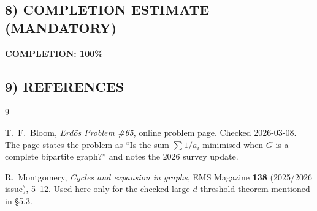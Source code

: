 \subsection*{8) COMPLETION ESTIMATE (MANDATORY)}

\textbf{COMPLETION: 100\%}

\subsection*{9) REFERENCES}

\begin{thebibliography}{9}

T.~F.~Bloom,
\emph{Erd\H{o}s Problem \#65}, online problem page.
Checked 2026-03-08.
The page states the problem as
``Is the sum $\sum 1/a_i$ minimised when $G$ is a complete bipartite graph?''
and notes the 2026 survey update.

R.~Montgomery,
\emph{Cycles and expansion in graphs},
EMS Magazine \textbf{138} (2025/2026 issue), 5--12.
Used here only for the checked large-$d$ threshold theorem mentioned in \S5.3.

\end{thebibliography}
